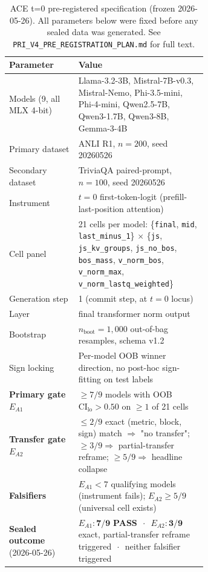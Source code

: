\begin{table}[t]
\centering
\caption{ACE t=0 pre-registered specification (frozen 2026-05-26).
All parameters below were fixed before any sealed data was generated.
See \texttt{PRI\_V4\_PRE\_REGISTRATION\_PLAN.md} for full text.}
\label{tab:ace_prereg_summary}
\small
\begin{tabular}{@{}lp{0.65\linewidth}@{}}
\toprule
\textbf{Parameter} & \textbf{Value} \\
\midrule
Models (9, all MLX 4-bit) & Llama-3.2-3B, Mistral-7B-v0.3, Mistral-Nemo, Phi-3.5-mini, Phi-4-mini, Qwen2.5-7B, Qwen3-1.7B, Qwen3-8B, Gemma-3-4B \\
Primary dataset & ANLI R1, $n=200$, seed 20260526 \\
Secondary dataset & TriviaQA paired-prompt, $n=100$, seed 20260526 \\
Instrument & $t{=}0$ first-token-logit (prefill-last-position attention) \\
Cell panel & 21 cells per model: \{\texttt{final}, \texttt{mid}, \texttt{last\_minus\_1}\} $\times$ \{\texttt{js}, \texttt{js\_kv\_groups}, \texttt{js\_no\_bos}, \texttt{bos\_mass}, \texttt{v\_norm\_bos}, \texttt{v\_norm\_max}, \texttt{v\_norm\_lastq\_weighted}\} \\
Generation step & 1 (commit step, at $t{=}0$ locus) \\
Layer & final transformer norm output \\
Bootstrap & $n_{\text{boot}}=1{,}000$ out-of-bag resamples, schema v1.2 \\
Sign locking & Per-model OOB winner direction, no post-hoc sign-fitting on test labels \\
\midrule
\textbf{Primary gate $E_{A1}$} & $\geq 7/9$ models with OOB $\text{CI}_{\text{lo}} > 0.50$ on $\geq 1$ of 21 cells \\
\textbf{Transfer gate $E_{A2}$} &
  $\leq 2/9$ exact (metric, block, sign) match $\Rightarrow$ "no transfer";
  $\geq 3/9 \Rightarrow$ partial-transfer reframe;
  $\geq 5/9 \Rightarrow$ headline collapse \\
\textbf{Falsifiers} & $E_{A1} < 7$ qualifying models (instrument fails); $E_{A2} \geq 5/9$ (universal cell exists) \\
\midrule
\textbf{Sealed outcome} (2026-05-26) & $E_{A1}: \mathbf{7/9}$ \textbf{PASS} $\,\cdot\,$ $E_{A2}: \mathbf{3/9}$ exact, partial-transfer reframe triggered $\,\cdot\,$ neither falsifier triggered \\
\bottomrule
\end{tabular}
\end{table}
